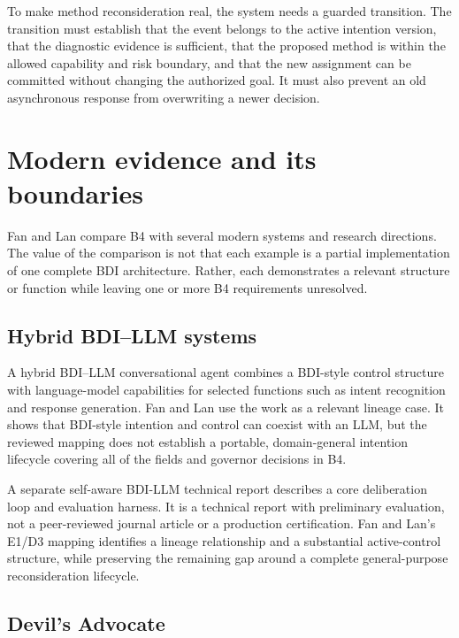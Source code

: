 To make method reconsideration real, the system needs a guarded transition. The transition must establish that the event belongs to the active intention version, that the diagnostic evidence is sufficient, that the proposed method is within the allowed capability and risk boundary, and that the new assignment can be committed without changing the authorized goal. It must also prevent an old asynchronous response from overwriting a newer decision.

\section{Modern evidence and its boundaries}
\label{sec:ch15-modern-evidence}

Fan and Lan compare B4 with several modern systems and research directions. The value of the comparison is not that each example is a partial implementation of one complete BDI architecture. Rather, each demonstrates a relevant structure or function while leaving one or more B4 requirements unresolved.

\subsection{Hybrid BDI--LLM systems}

A hybrid BDI--LLM conversational agent combines a BDI-style control structure with language-model capabilities for selected functions such as intent recognition and response generation. Fan and Lan use the work as a relevant lineage case. It shows that BDI-style intention and control can coexist with an LLM, but the reviewed mapping does not establish a portable, domain-general intention lifecycle covering all of the fields and governor decisions in B4.\autocite{owayyed2025controlled}

A separate self-aware BDI-LLM technical report describes a core deliberation loop and evaluation harness. It is a technical report with preliminary evaluation, not a peer-reviewed journal article or a production certification. Fan and Lan's E1/D3 mapping identifies a lineage relationship and a substantial active-control structure, while preserving the remaining gap around a complete general-purpose reconsideration lifecycle.\autocite{lawton2026selfawarebdi}

\subsection{Devil's Advocate}

